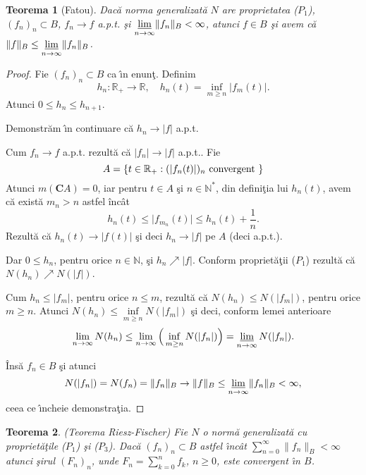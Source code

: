 \documentclass[ a4paper, 12pt]{report}
\newtheorem{theorem}{\bf Teorema}[section]
\theoremstyle{definition}
\theoremstyle{remark}
\numberwithin{equation}{section}
\begin{document}
\begin{theorem}[Fatou]\label{Fatou}
Dac\u a norma generalizat\u a $N$ are proprietatea ($P_1$), $(f_n)_n \subset B$, $f_n \rightarrow f$ a.p.t. \c si $\varliminf\limits_{n \rightarrow \infty}\lVert f_n \rVert_B < \infty$, atunci $f \in B$ \c si avem c\u a $\lVert f\rVert_B \leq \varliminf\limits_{n \rightarrow \infty} \lVert f_n \rVert_B$.
\end{theorem}

\begin{proof} Fie $(f_n)_n \subset B$ ca \^\i n enun\c t. Definim
$$h_n : \mathbb{R}_+ \rightarrow \mathbb{R}, \quad  h_n(t) = \inf\limits_{m \geq n} \lvert f_m(t) \rvert.$$
Atunci $0 \leq h_n \leq h_{n+1}$.

Demonstr\u am  \^\i n continuare c\u a $h_n \rightarrow \lvert f \rvert$ a.p.t.

\smallskip

Cum $f_n \rightarrow f$ a.p.t. rezult\u a c\u a $\lvert f_n \rvert \rightarrow \lvert f \rvert$ a.p.t.. Fie
$$A = \{t \in \mathbb{R}_+ : (\lvert f_n(t) \rvert)_n \hbox{ convergent }\}$$
Atunci $m(\mathbf{C}A) = 0$, iar pentru $t \in A$ \c si $n \in \mathbb{N}^\ast$, din defini\c tia lui $h_n(t)$, avem c\u a exist\u a $m_n > n$ astfel \^inc\^at
$$h_n(t)\leq \lvert f_{m_n}(t) \rvert \leq h_n(t) + \frac{1}{n}.$$
Rezult\u a c\u a $h_n(t) \rightarrow \lvert f(t)\rvert$ \c si deci $h_n \rightarrow \lvert f\rvert$ pe $A$ (deci a.p.t.).

Dar $0 \leq h_n$, pentru orice $n \in \mathbb{N}$, \c si $h_n \nearrow \lvert f\rvert$. Conform propriet\u a\c tii ($P_1$) rezult\u a c\u a $N(h_n) \nearrow N(\lvert f\rvert)$.

Cum $h_n \leq \lvert f_m \rvert$, pentru orice $n \leq m$, rezult\u a c\u a $N(h_n) \leq N(\lvert f_m \rvert)$, pentru orice $m \geq n$. Atunci $N(h_n) \leq \inf\limits_{m \geq n} N(\lvert f_m \rvert)$ \c si deci, conform lemei anterioare
$$\lim\limits_{n \rightarrow \infty} N(h_n) \leq \lim\limits_{n \rightarrow \infty} \Big(\inf\limits_{m \geq n} N(\lvert f_n \rvert)\Big) = \varliminf\limits_{n \rightarrow \infty} N(\lvert f_n \rvert).$$

\^Ins\u a $f_n \in B$ \c si atunci
$$N(\lvert f_n \rvert) = N(f_n) = \lVert f_n \rVert_B \rightarrow \lVert f\rVert_B \leq \varliminf\limits_{n \rightarrow \infty}\lVert f_n\rVert_B < \infty,$$
ceea ce \^\i ncheie demonstra\c tia.
\end{proof}

\begin{theorem} {\rm (Teorema Riesz-Fischer)} Fie $N$ o norm\u  a generalizat\u a cu propriet\u a\c tile ($P_1$) \c si ($P_3$). Dac\u a $(f_n)_n \subset B$ astfel \^\i nc\^ at $\sum\limits_{n = 0}^\infty \lVert f_n \rVert_{B} < \infty$ atunci \c sirul $(F_n)_n$, unde $F_n = \sum \limits_{k = 0}^n f_k$, $n \geq 0$, este convergent \^\i n $B$.
\end{theorem}
\end{document}
